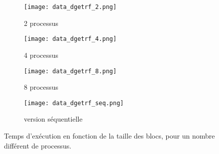 \begin{figure}
\centering
\begin{subfigure}[b]{0.48\textwidth}
\texttt{[image: data\_dgetrf\_2.png]}
\caption{2 processus}
\label{fig:d_2}
\end{subfigure}
\begin{subfigure}[b]{0.48\textwidth}
\texttt{[image: data\_dgetrf\_4.png]}
\caption{4 processus}
\label{fig:d_4}
\end{subfigure}

\begin{subfigure}[b]{0.48\textwidth}
\texttt{[image: data\_dgetrf\_8.png]}
\caption{8 processus}
\label{fig:d_8}
\end{subfigure}
\begin{subfigure}[b]{0.48\textwidth}
\centering
\texttt{[image: data\_dgetrf\_seq.png]}
\caption{version séquentielle}
\label{fig:d_s}
\end{subfigure}
\caption{Temps d'exécution en fonction de la taille des blocs, pour un nombre différent de processus.}
\end{figure}

